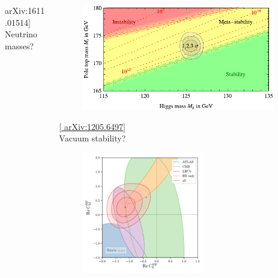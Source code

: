 \documentclass[10pt,aspectratio=169]{beamer}
\begin{document}
\begin{frame}
\begin{columns}[t]
\begin{column}{0.7\textwidth}
\begin{columns}[t]
\begin{column}{0.5\textwidth}
\begin{center}
{{              arXiv:1611.01514}]} \\
            Neutrino masses?
          \end{center}
        \end{column}
        \begin{column}{0.5\textwidth}
          \vspace*{-30pt}
          \begin{figure}
            \centering
            \includegraphics[width=0.95\textwidth]{sm_vacuum_stability}
          \end{figure}
          \vspace*{-22pt}
          \begin{center}
            {\tiny [\href{http://arxiv.org/abs/1205.6497}{%
                  arXiv:1205.6497}] }\\
            Vacuum stability?
          \end{center}
          \vspace*{-15pt}
          \begin{figure}
            \centering
            \includegraphics[width=0.6\textwidth]{flavour_anomalies}

\end{figure}
\end{column}
\end{columns}
\end{column}
\end{columns}
\end{frame}
\end{document}
